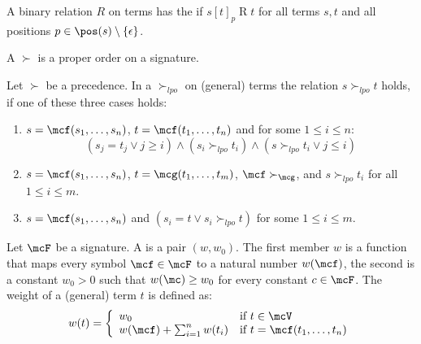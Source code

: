 
\begin{definition}
	A binary relation \( R \) on terms has the  if
	\( s[t]_p\mathbin{R}t \) for all terms \( s,t \) and all positions \( p\in\pos(s) \setminus \{\epsilon\} \).
\end{definition}

\begin{definition}\label{def:prec}
	A  \( \succ \) is a proper order
	on a signature.
\end{definition}

\begin{definition}[LPO]\label{def:lpo}
	Let \( \succ \) be a precedence. In a  \( \succ_{lpo} \) on (general) terms the relation \( s\succ_{lpo} t \) holds,
	if one of these three cases holds:
	\begin{enumerate}
		\item \( s=\mcf(s_1,\ldots,s_n) \), \( t=\mcf(t_1,\ldots,t_n) \) and for some \( 1\leq i\leq n \):
		\[
		(s_j=t_j\lor j\geq i) \land (s_i\succ_{lpo} t_i) \land (s\succ_{lpo} t_i \lor j\leq i)
		\]
		\item \( s=\mcf(s_1,\ldots,s_n) \), \( t=\mcg(t_1,\ldots,t_m) \), \( \mcf\succ_\mcg \), and \( s\succ_{lpo} t_i \) for all \( 1\leq i\leq m \).
		\item \( s=\mcf(s_1,\ldots,s_n) \) and \( (s_i=t \lor s_i\succ_{lpo} t) \) for some \( 1\leq i\leq m \).
	\end{enumerate}
\end{definition}

\begin{definition}\label{def:weight}
	Let \( \mcF \) be a signature.
	A  is a pair \( (w,w_0) \).
	The first member \( w \) is a function that maps every symbol \( \mcf\in\mcF \) to a natural number \( w(\mcf) \),
	the second is a constant \( w_0>0 \) such that \( w(\mc)\geq w_0 \) for every constant \( c\in\mcF \).
	The weight of a (general) term \( t \) is defined as:
	\begin{gather*}
	w(t) = \left\{ \begin{array}{ll}
	w_0 & \text{if } t\in\mcV\\
	w(\mcf)+\sum_{i=1}^n w(t_i) & \text{if }t=\mcf(t_1,\ldots,t_n)
	\end{array}\right.
	\end{gather*}
\end{definition}

